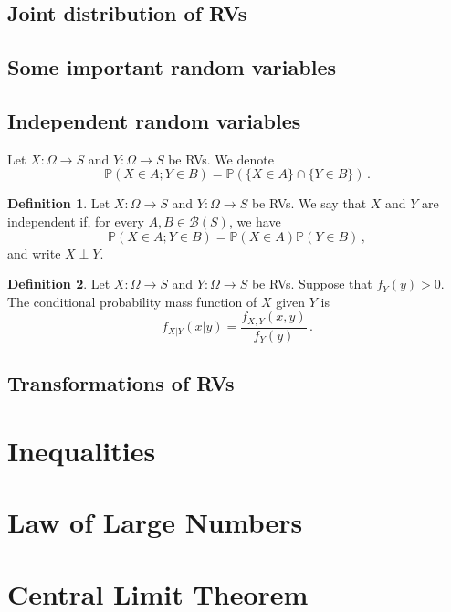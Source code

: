 \documentclass[
  openany]{book}
\theoremstyle{definition}
\newtheorem{definition}{Definition}[chapter]
\theoremstyle{definition}
\theoremstyle{definition}
\theoremstyle{definition}
\theoremstyle{remark}
\begin{document}
\subsection{Joint distribution of RVs}\label{joint-distribution-of-rvs}

\subsection{Some important random variables}\label{some-important-random-variables}

\subsection{Independent random variables}\label{independent-random-variables}

Let \(X:\Omega \to S\) and \(Y: \Omega \to S\) be RVs.
We denote
\[ \mathbb{P}(X \in A; Y \in B) = \mathbb{P}(\{X\in A\} \cap \{Y \in B \}) \,. \]

\begin{definition}
Let \(X:\Omega \to S\) and \(Y: \Omega \to S\) be RVs.
We say that \(X\) and \(Y\) are independent if,
for every \(A, B \in \mathcal{B}(S)\), we have
\[ \mathbb{P}( X \in A; Y \in B) = \mathbb{P}(X \in A) \mathbb{P}(Y \in B) \,, \]
and write \(X \perp Y\).
\end{definition}

\begin{definition}
Let \(X:\Omega \to S\) and \(Y: \Omega \to S\) be RVs.
Suppose that \(f_Y(y) >0\).
The conditional probability mass function of \(X\) given \(Y\) is
\[ f_{X|Y} (x|y) =
\frac{f_{X,Y}(x,y)}{f_Y(y)} \,.\]
\end{definition}

\subsection{Transformations of RVs}\label{transformations-of-rvs}

\section{Inequalities}\label{inequalities}

\section{Law of Large Numbers}\label{law-of-large-numbers}

\section{Central Limit Theorem}\label{central-limit-theorem}
\end{document}
